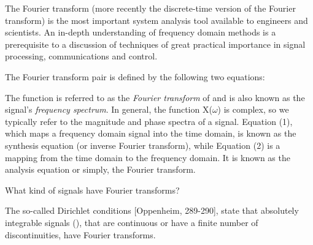 \documentclass{article}
\begin{document}
\begin{CellGroup}


The Fourier transform (more recently the discrete-time version of the Fourier transform) is the most important system analysis tool available to
engineers and scientists. An in-depth understanding of frequency domain methods is a prerequisite to a discussion of techniques of great practical
importance in signal processing, communications and control.


\end{CellGroup}
\begin{CellGroup}


The Fourier transform pair is defined by the following two equations:







The function  is referred to as the {\itshape Fourier transform} of  and is also known as the signal's
{\itshape frequency spectrum}. In general, the function X(\(\omega \)) is complex, so we typically refer to the magnitude and phase spectra of a
signal. Equation (1), which maps a frequency domain signal into the time domain, is known as the synthesis equation (or inverse Fourier transform),
while Equation (2) is a mapping from the time domain to the frequency domain. It is known as the analysis equation or simply, the Fourier transform.

What kind of signals have Fourier transforms?

The so-called Dirichlet conditions [Oppenheim, 289-290], state that absolutely integrable signals (), that are continuous or have a finite number of discontinuities, have Fourier transforms.




\end{CellGroup}
\end{document}
